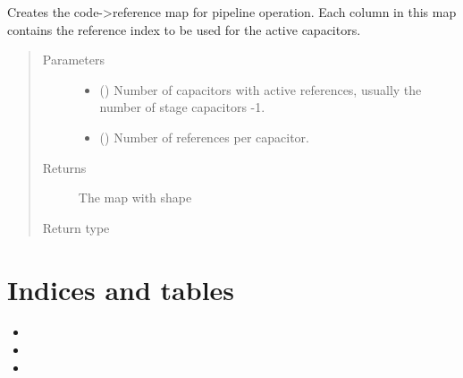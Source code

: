 \documentclass[letterpaper,10pt,english]{sphinxmanual}
\begin{document}
\begin{fulllineitems}
\label{\detokenize{gen:calib.gen.pipe_map}}
Creates the code-\textgreater{}reference map for pipeline operation. Each column in this
map contains the reference index to be used for the active capacitors.
\begin{quote}\begin{description}
\item[{Parameters}] \leavevmode\begin{itemize}
\item {} 
 () \textendash{} Number of capacitors with active references,
usually the number of stage capacitors -1.

\item {} 
 () \textendash{} Number of references per capacitor.

\end{itemize}

\item[{Returns}] \leavevmode
The map with shape 

\item[{Return type}] \leavevmode
{}

\end{description}\end{quote}

\end{fulllineitems}



\chapter{Indices and tables}
\label{\detokenize{index:indices-and-tables}}\begin{itemize}
\item {} 

\item {} 

\item {} 

\end{itemize}


\renewcommand{\indexname}{Python Module Index}
\begin{sphinxtheindex}
\let\bigletter\sphinxstyleindexlettergroup
\bigletter{c}
\item\relax{}
\end{sphinxtheindex}

\renewcommand{\indexname}{Index}
\printindex
\end{document}
